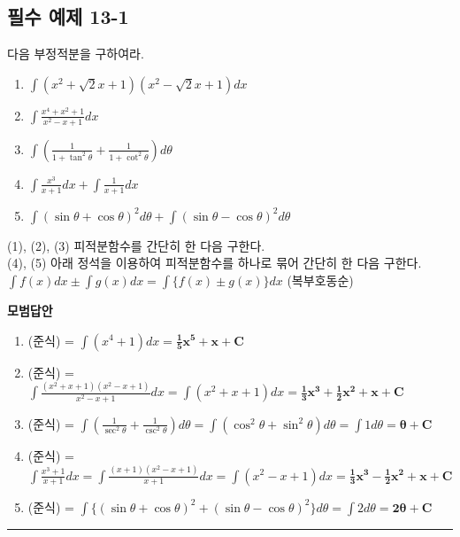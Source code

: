 \documentclass[a4paper,11pt]{article}
\begin{document}
\subsection*{필수 예제 13-1}
다음 부정적분을 구하여라.
\begin{enumerate}[label=(\arabic*)]
    \item $\displaystyle \int (x^{2}+\sqrt{2}x+1)(x^{2}-\sqrt{2}x+1)dx$
    \item $\displaystyle \int \frac{x^{4}+x^{2}+1}{x^{2}-x+1}dx$
    \item $\displaystyle \int \left( \frac{1}{1+\tan^{2}\theta} + \frac{1}{1+\cot^{2}\theta} \right) d\theta$
    \item $\displaystyle \int \frac{x^{3}}{x+1}dx + \int \frac{1}{x+1}dx$
    \item $\displaystyle \int (\sin\theta+\cos\theta)^{2}d\theta + \int (\sin\theta-\cos\theta)^{2}d\theta$
\end{enumerate}

\begin{studybox}
(1), (2), (3) 피적분함수를 간단히 한 다음 구한다.\\
(4), (5) 아래 정석을 이용하여 피적분함수를 하나로 묶어 간단히 한 다음 구한다.\\
$\displaystyle \int f(x)dx \pm \int g(x)dx = \int \{f(x) \pm g(x)\}dx$ (복부호동순)
\end{studybox}

\textbf{모범답안}
\begin{enumerate}[label=(\arabic*)]
    \item (준식) = $\displaystyle \int (x^4+1)dx = \mathbf{\frac{1}{5}x^5+x+C}$
    \item (준식) = $\displaystyle \int \frac{(x^2+x+1)(x^2-x+1)}{x^2-x+1}dx = \int (x^2+x+1)dx = \mathbf{\frac{1}{3}x^3+\frac{1}{2}x^2+x+C}$
    \item (준식) = $\displaystyle \int (\frac{1}{\sec^2 \theta} + \frac{1}{\csc^2 \theta})d\theta = \int (\cos^2 \theta + \sin^2 \theta)d\theta = \int 1 d\theta = \mathbf{\theta+C}$
    \item (준식) = $\displaystyle \int \frac{x^3+1}{x+1}dx = \int \frac{(x+1)(x^2-x+1)}{x+1}dx = \int (x^2-x+1)dx = \mathbf{\frac{1}{3}x^3-\frac{1}{2}x^2+x+C}$
    \item (준식) = $\displaystyle \int \{(\sin\theta+\cos\theta)^2 + (\sin\theta-\cos\theta)^2\}d\theta = \int 2 d\theta = \mathbf{2\theta+C}$
\end{enumerate}

\vspace{0.5cm}
\hrule
\vspace{0.5cm}
\end{document}
